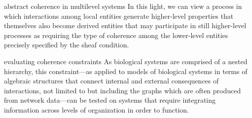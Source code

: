 \begin{frame}
\begin{block}{abstract coherence in multilevel systems}
In this light, we can view a process in which interactions among local entities generate higher-level properties that themselves also become derived entities that may participate in still higher-level processes as requiring the type of coherence among the lower-level entities precisely specified by the sheaf condition. 
\end{block}
\begin{block}{evaluating coherence constraints}
As biological systems are comprised of a nested hierarchy, this constraint---as applied to models of biological systems in terms of algebraic structures that connect internal and external consequences of interactions, not limited to but including the graphs which are often produced from network data---can be tested on systems that require integrating information across levels of organization in order to function.
\end{block}
\end{frame}